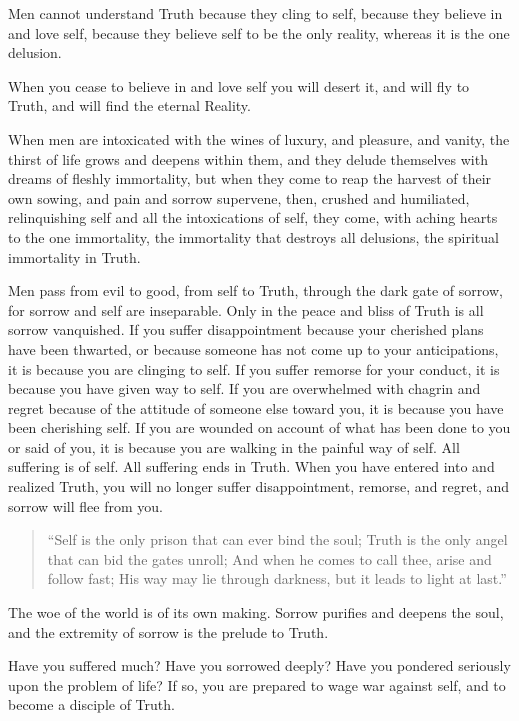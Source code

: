 \documentclass[12pt,oneside]{scrbook}
\begin{document}
  Men cannot understand Truth because they cling to self, because they
  believe in and love self, because they believe self to be the only
  reality, whereas it is the one delusion.
  
  When you cease to believe in and love self you will desert it, and will
  fly to Truth, and will find the eternal Reality.
  
  When men are intoxicated with the wines of luxury, and pleasure, and
  vanity, the thirst of life grows and deepens within them, and they
  delude themselves with dreams of fleshly immortality, but when they come
  to reap the harvest of their own sowing, and pain and sorrow supervene,
  then, crushed and humiliated, relinquishing self and all the
  intoxications of self, they come, with aching hearts to the one
  immortality, the immortality that destroys all delusions, the spiritual
  immortality in Truth.
  
  Men pass from evil to good, from self to Truth, through the dark gate of
  sorrow, for sorrow and self are inseparable. Only in the peace and bliss
  of Truth is all sorrow vanquished. If you suffer disappointment because
  your cherished plans have been thwarted, or because someone has not come
  up to your anticipations, it is because you are clinging to self. If you
  suffer remorse for your conduct, it is because you have given way to
  self. If you are overwhelmed with chagrin and regret because of the
  attitude of someone else toward you, it is because you have been
  cherishing self. If you are wounded on account of what has been done to
  you or said of you, it is because you are walking in the painful way of
  self. All suffering is of self. All suffering ends in Truth. When you
  have entered into and realized Truth, you will no longer suffer
  disappointment, remorse, and regret, and sorrow will flee from you.
  
  \begin{quote}
  ``Self is the only prison that can ever bind the soul; Truth is the only
  angel that can bid the gates unroll; And when he comes to call thee,
  arise and follow fast; His way may lie through darkness, but it leads to
  light at last.''
  \end{quote}
  
  The woe of the world is of its own making. Sorrow purifies and deepens
  the soul, and the extremity of sorrow is the prelude to Truth.
  
  Have you suffered much? Have you sorrowed deeply? Have you pondered
  seriously upon the problem of life? If so, you are prepared to wage war
  against self, and to become a disciple of Truth.
  
\end{document}
